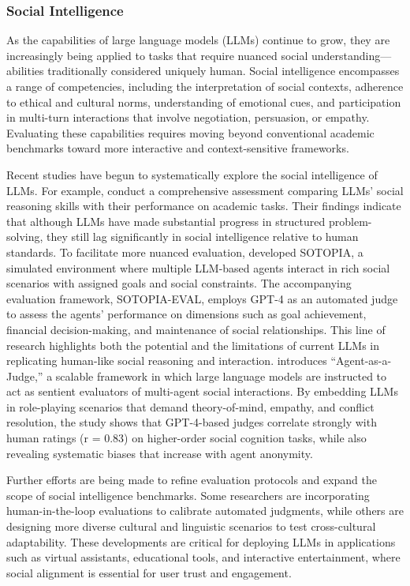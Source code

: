 \documentclass[acmsmall,screen]{acmart}
\begin{document}
\subsubsection{\textbf{Social Intelligence}}
As the capabilities of large language models (LLMs) continue to grow, they are increasingly being applied to tasks that require nuanced social understanding—abilities traditionally considered uniquely human. Social intelligence encompasses a range of competencies, including the interpretation of social contexts, adherence to ethical and cultural norms, understanding of emotional cues, and participation in multi-turn interactions that involve negotiation, persuasion, or empathy. Evaluating these capabilities requires moving beyond conventional academic benchmarks toward more interactive and context-sensitive frameworks.

Recent studies have begun to systematically explore the social intelligence of LLMs. For example, \citet{xu2024academically} conduct a comprehensive assessment comparing LLMs' social reasoning skills with their performance on academic tasks. Their findings indicate that although LLMs have made substantial progress in structured problem-solving, they still lag significantly in social intelligence relative to human standards. To facilitate more nuanced evaluation, \citet{zhou2023sotopia} developed SOTOPIA, a simulated environment where multiple LLM-based agents interact in rich social scenarios with assigned goals and social constraints. The accompanying evaluation framework, SOTOPIA-EVAL, employs GPT-4 as an automated judge to assess the agents’ performance on dimensions such as goal achievement, financial decision-making, and maintenance of social relationships. This line of research highlights both the potential and the limitations of current LLMs in replicating human-like social reasoning and interaction. \citet{zhang2025sentient} introduces “Agent-as-a-Judge,” a scalable framework in which large language models are instructed to act as sentient evaluators of multi-agent social interactions. By embedding LLMs in role-playing scenarios that demand theory-of-mind, empathy, and conflict resolution, the study shows that GPT-4-based judges correlate strongly with human ratings (r = 0.83) on higher-order social cognition tasks, while also revealing systematic biases that increase with agent anonymity.

Further efforts are being made to refine evaluation protocols and expand the scope of social intelligence benchmarks. Some researchers are incorporating human-in-the-loop evaluations to calibrate automated judgments, while others are designing more diverse cultural and linguistic scenarios to test cross-cultural adaptability. These developments are critical for deploying LLMs in applications such as virtual assistants, educational tools, and interactive entertainment, where social alignment is essential for user trust and engagement.
\end{document}
